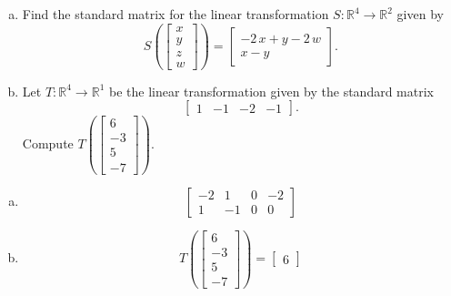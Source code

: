 
\begin{exerciseStatement}

\begin{enumerate}[(a)]
\item Find the standard matrix for the linear transformation \(S:\mathbb{R}^ 4  \to \mathbb{R}^ 2 \) given by \[S\left(  \left[\begin{array}{c}
x \\
y \\
z \\
{w}
\end{array}\right]  \right) =  \left[\begin{array}{c}
-2 \, x + y - 2 \, {w} \\
x - y
\end{array}\right] .\]
\item Let \(T:\mathbb{R}^ 4  \to \mathbb{R}^ 1 \) be the linear transformation given by the standard matrix \[ \left[\begin{array}{cccc}
1 & -1 & -2 & -1
\end{array}\right] .\] Compute \(T\left( \left[\begin{array}{c}
6 \\
-3 \\
5 \\
-7
\end{array}\right]  \right)\). 
\end{enumerate}
    
\end{exerciseStatement}
    
\begin{exerciseAnswer} 

\begin{enumerate}[(a)]
\item \[ \left[\begin{array}{cccc}
-2 & 1 & 0 & -2 \\
1 & -1 & 0 & 0
\end{array}\right] \]
\item \[T\left( \left[\begin{array}{c}
6 \\
-3 \\
5 \\
-7
\end{array}\right]  \right)= \left[\begin{array}{c}
6
\end{array}\right] \]
\end{enumerate}
    
\end{exerciseAnswer}
    
